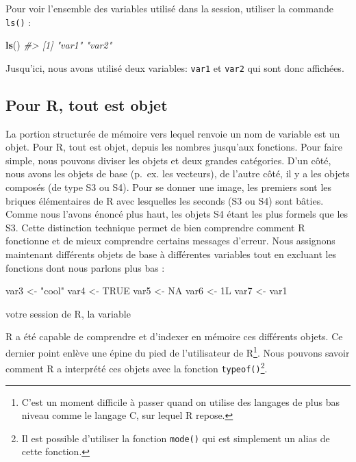 \documentclass[]{article}
\newenvironment{Shaded}{\begin{snugshade}}{\end{snugshade}}
\newcommand{\CommentTok}[1]{\textcolor[rgb]{0.56,0.35,0.01}{\textit{#1}}}
\newcommand{\KeywordTok}[1]{\textcolor[rgb]{0.13,0.29,0.53}{\textbf{#1}}}
\newcommand{\NormalTok}[1]{#1}
\newcommand{\OtherTok}[1]{\textcolor[rgb]{0.56,0.35,0.01}{#1}}
\newcommand{\StringTok}[1]{\textcolor[rgb]{0.31,0.60,0.02}{#1}}
\begin{document}
Pour voir l'ensemble des variables utilisé dans la session, utiliser la commande
\texttt{ls()} :

\begin{Shaded}
\begin{Highlighting}[]
\KeywordTok{ls}\NormalTok{()}
\CommentTok{#> [1] "var1" "var2"}
\end{Highlighting}
\end{Shaded}

Jusqu'ici, nous avons utilisé deux variables: \texttt{var1} et \texttt{var2} qui sont donc
affichées.

\hypertarget{pour-r-tout-est-objet}{%
\subsection*{Pour R, tout est objet}\label{pour-r-tout-est-objet}}

La portion structurée de mémoire vers lequel renvoie un nom de variable est un
objet. Pour R, tout est objet, depuis les nombres jusqu'aux fonctions. Pour faire simple, nous pouvons diviser les objets et deux grandes catégories. D'un côté, nous avons les objets de base (p.~ex. les vecteurs), de l'autre côté, il y a les objets composés (de type S3 ou S4). Pour se donner une image, les premiers sont les briques élémentaires de R avec lesquelles les seconds (S3 ou S4) sont bâties. Comme nous l'avons énoncé plus haut, les objets S4 étant les plus formels que les S3. Cette distinction technique permet de bien comprendre comment R fonctionne et de mieux comprendre certains messages d'erreur. Nous assignons maintenant différents objets de base à différentes variables tout en excluant les fonctions dont nous parlons plus bas :

\begin{Shaded}
\begin{Highlighting}[]
\NormalTok{var3 <-}\StringTok{ "cool"}
\NormalTok{var4 <-}\StringTok{ }\OtherTok{TRUE}
\NormalTok{var5 <-}\StringTok{ }\OtherTok{NA}
\NormalTok{var6 <-}\StringTok{ }\NormalTok{1L}
\NormalTok{var7 <-}\StringTok{ }\NormalTok{var1}
\end{Highlighting}
\end{Shaded}

votre session de R, la variable

R a été capable de comprendre et d'indexer en mémoire ces différents objets. Ce dernier point enlève une épine du pied de l'utilisateur de R\footnote{C'est un moment difficile à passer quand on utilise des langages de plus bas niveau comme le langage C, sur lequel R repose.}. Nous pouvons savoir comment R a interprété ces objets avec la fonction \texttt{typeof()}\footnote{Il est possible d'utiliser la fonction \texttt{mode()} qui est simplement un alias de cette fonction.}.
\end{document}
